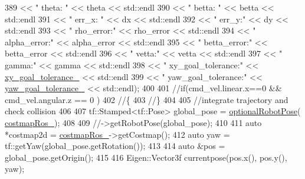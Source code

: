 \begin{DoxyCode}
{389                                               << \textcolor{stringliteral}{" theta: "} << theta << std::endl
390                                               << \textcolor{stringliteral}{" betta: "} << betta << std::endl
391                                               << \textcolor{stringliteral}{" err\_x: "} << dx << std::endl
392                                               << \textcolor{stringliteral}{" err\_y:"} << dy << std::endl
393                                               << \textcolor{stringliteral}{" rho\_error:"} << rho\_error << std::endl
394                                               << \textcolor{stringliteral}{" alpha\_error:"} << alpha\_error << std::endl
395                                               << \textcolor{stringliteral}{" betta\_error:"} << betta\_error << std::endl
396                                               << \textcolor{stringliteral}{" vetta:"} << vetta << std::endl
397                                               << \textcolor{stringliteral}{" gamma:"} << gamma << std::endl
398                                               << \textcolor{stringliteral}{" xy\_goal\_tolerance:"} << 
      \hyperlink{classcl__move__base__z_1_1forward__local__planner_1_1ForwardLocalPlanner_acd2ed91ee166f03faeeb9d6a4b91084b}{xy\_goal\_tolerance\_} << std::endl
399                                               << \textcolor{stringliteral}{" yaw\_goal\_tolerance:"} << 
      \hyperlink{classcl__move__base__z_1_1forward__local__planner_1_1ForwardLocalPlanner_a7ea1ca266850c7b847a2355f489e6041}{yaw\_goal\_tolerance\_} << std::endl);
400 
401     \textcolor{comment}{//if(cmd\_vel.linear.x==0 && cmd\_vel.angular.z == 0 )}
402     \textcolor{comment}{//\{}
403     \textcolor{comment}{//\}}
404 
405     \textcolor{comment}{//integrate trajectory and check collision}
406 
407     tf::Stamped<tf::Pose> global\_pose = \hyperlink{namespacecl__move__base__z_1_1forward__local__planner_a4c20f9fe0ca67779c53e90182baf4997}{optionalRobotPose}(
      \hyperlink{classcl__move__base__z_1_1forward__local__planner_1_1ForwardLocalPlanner_a37791fea67ce92c6e38e3727311e533b}{costmapRos\_});
408 
409     \textcolor{comment}{//->getRobotPose(global\_pose);}
410 
411     \textcolor{keyword}{auto} *costmap2d = \hyperlink{classcl__move__base__z_1_1forward__local__planner_1_1ForwardLocalPlanner_a37791fea67ce92c6e38e3727311e533b}{costmapRos\_}->getCostmap();
412     \textcolor{keyword}{auto} yaw = tf::getYaw(global\_pose.getRotation());
413 
414     \textcolor{keyword}{auto} &pos = global\_pose.getOrigin();
415 
416     Eigen::Vector3f currentpose(pos.x(), pos.y(), yaw);
}
\end{DoxyCode}
